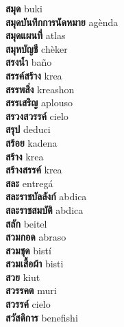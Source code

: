 \textbf{ สมุด  } buki \\
\textbf{ สมุดบันทึกการนัดหมาย  } agènda \\
\textbf{ สมุดแผนที่  } atlas \\
\textbf{ สมุหบัญชี  } chèker \\
\textbf{ สรงน้ำ  } baño \\
\textbf{ สรรค์สร้าง  } krea \\
\textbf{ สรรพสิ่ง  } kreashon \\
\textbf{ สรรเสริญ  } aplouso \\
\textbf{ สรวงสวรรค์  } cielo \\
\textbf{ สรุป  } deduci \\
\textbf{ สร้อย  } kadena \\
\textbf{ สร้าง  } krea \\
\textbf{ สร้างสรรค์  } krea \\
\textbf{ สละ  } entregá \\
\textbf{ สละราชบัลลังก์  } abdica \\
\textbf{ สละราชสมบัติ  } abdica \\
\textbf{ สลัก  } beitel \\
\textbf{ สวมกอด  } abraso \\
\textbf{ สวมชุด  } bistí \\
\textbf{ สวมเสื้อผ้า  } bisti \\
\textbf{ สวย  } kiut \\
\textbf{ สวรรคต  } muri \\
\textbf{ สวรรค์  } cielo \\
\textbf{ สวัสดิการ  } benefishi \\
